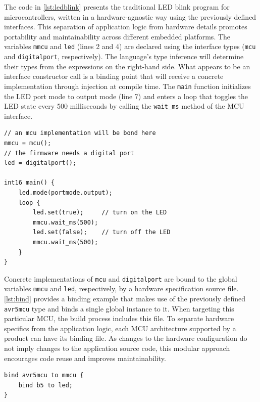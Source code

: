 \documentclass[10pt,sigplan,screen,anonymous]{acmart}
\begin{document}


The code in \autoref{lst:ledblink} presents the traditional LED blink program for microcontrollers, written in a hardware-agnostic way using the previously defined interfaces. This separation of application logic from hardware details promotes portability and maintainability across different embedded platforms. The variables {\tt mmcu} and {\tt led} (lines 2 and 4) are declared using the interface types ({\tt mcu} and {\tt digitalport}, respectively). The language's type inference will determine their types from the expressions on the right-hand side. What appears to be an interface constructor call is a binding point that will receive a concrete implementation through injection at compile time. The {\tt main} function initializes the LED port mode to output mode (line 7) and enters a loop that toggles the LED state every 500 milliseconds by calling the {\tt wait\_ms} method of the MCU interface.



\begin{lstlisting}[float=bp, caption=A hardware-agnostic LED blink example., label={lst:ledblink}]
// an mcu implementation will be bond here
mmcu = mcu();
// the firmware needs a digital port
led = digitalport();

int16 main() {
	led.mode(portmode.output);
	loop {
		led.set(true);     // turn on the LED
		mmcu.wait_ms(500);
		led.set(false);    // turn off the LED
		mmcu.wait_ms(500);
	}
}
\end{lstlisting}

Concrete implementations of {\tt mcu} and {\tt digitalport} are bound to the global variables {\tt mmcu} and {\tt led}, respectively, by a hardware specification source file. \autoref{lst:bind} provides a binding example that makes use of the previously defined {\tt avr5mcu} type and binds a single global instance to it. When targeting this particular MCU, the build process includes this file. To separate hardware specifics from the application logic, each MCU architecture supported by a product can have its binding file. As changes to the hardware configuration do not imply changes to the application source code, this modular approach encourages code reuse and improves maintainability.


\begin{lstlisting}[float=bp, caption=DI code for binding an AVR MCU in the LED blink example., label=lst:bind]
bind avr5mcu to mmcu {
	bind b5 to led;
}
\end{lstlisting}
\end{document}
